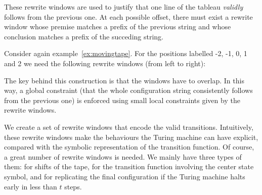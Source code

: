 These rewrite windows are used to justify that one line of the tableau \emph{validly} follows from the previous one. At each possible offset, there must exist a rewrite window whose premise matches a prefix of the previous string and whose conclusion matches a prefix of the succeding string.

\begin{example}\label{ex:rewwindows}
  Consider again example~\ref{ex:movingtape}. For the positions labelled -2, -1, 0, 1 and 2 we need the following rewrite windows (from left to right):
  \begin{center}
  \end{center}
\end{example}

The key behind this construction is that the windows have to overlap. In this way, a global constraint (that the whole configuration string consistently follows from the previous one) is enforced using small local constraints given by the rewrite windows.

We create a set of rewrite windows that encode the valid transitions. 
Intuitively, these rewrite windows make the behaviours the Turing machine can have explicit, compared with the symbolic representation of the transition function.
Of course, a great number of rewrite windows is needed. We mainly have three types of them: for shifts of the tape, for the transition function involving the center state symbol, and for replicating the final configuration if the Turing machine halts early in less than $t$ steps.

